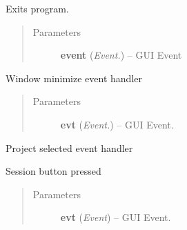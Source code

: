 \documentclass[letterpaper,10pt,english]{sphinxmanual}
\begin{document}
\begin{fulllineitems}

\begin{fulllineitems}
\label{api:wos.GUI.OnExit}
Exits program.
\begin{quote}\begin{description}
\item[{Parameters}] \leavevmode
\textbf{event} (\emph{Event.}) -- GUI Event

\end{description}\end{quote}

\end{fulllineitems}


\begin{fulllineitems}
\label{api:wos.GUI.OnIconify}
Window minimize event handler
\begin{quote}\begin{description}
\item[{Parameters}] \leavevmode
\textbf{evt} (\emph{Event.}) -- GUI Event.

\end{description}\end{quote}

\end{fulllineitems}


\begin{fulllineitems}
\label{api:wos.GUI.OnProjectSelected}
Project selected event handler

\end{fulllineitems}


\begin{fulllineitems}
\label{api:wos.GUI.OnSession}
Session button pressed
\begin{quote}\begin{description}
\item[{Parameters}] \leavevmode
\textbf{evt} (\emph{Event}) -- GUI Event.

\end{description}\end{quote}


\end{fulllineitems}
\end{fulllineitems}
\end{document}
